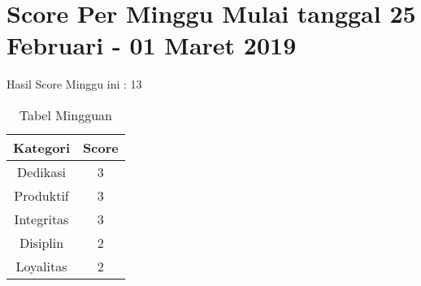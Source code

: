 \section {Score Per Minggu Mulai tanggal 25 Februari - 01 Maret 2019}
Hasil Score Minggu ini : 13
\begin{table}[h]
\caption{Tabel Mingguan}
\centering
\begin{tabular}{|c|c|}
\hline
\textbf{Kategori}&\textbf{Score}\\
\hline
Dedikasi&3\\
\hline
Produktif&3\\
\hline
Integritas&3\\
\hline
Disiplin&2\\
\hline
Loyalitas&2\\
\hline
\end{tabular}
\label{tsble:Laporan mingguan}
\end{table}
